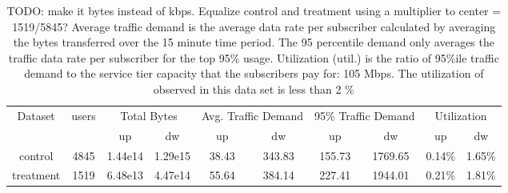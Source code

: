 \begin{table}[t]
\begin{tabular}{cccccccccc}
\hline
Dataset   & users & \multicolumn{2}{c}{Total Bytes} & \multicolumn{2}{c}{Avg. Traffic Demand} & \multicolumn{2}{c}{95\% Traffic Demand} & \multicolumn{2}{c}{Utilization} \\
          &       & up             & dw             & up                 & dw                 & up                 & dw                 & up             & dw             \\
control   & 4845  & 1.44e14        & 1.29e15        & 38.43              & 343.83             & 155.73             & 1769.65            & 0.14\%         & 1.65\%         \\
treatment & 1519  & 6.48e13        & 4.47e14        & 55.64              & 384.14             & 227.41             & 1944.01            & 0.21\%         & 1.81\%         \\ \hline
\end{tabular}
\caption{TODO: make it bytes instead of kbps. Equalize control and treatment 
using a multiplier to center = 1519/5845?
 Average traffic demand is the average data rate per subscriber 
 calculated by averaging the bytes transferred over the 15 minute time period. 
 The 95 percentile demand only averages the traffic data rate per subscriber 
for the top 95\% usage. Utilization (util.) is the ratio of 95\%ile traffic 
demand to the service tier capacity that the subscribers pay for: 105 Mbps. The 
utilization of observed in this data set is less than 2 \%}
\label{tab:data-stats}
\end{table}



